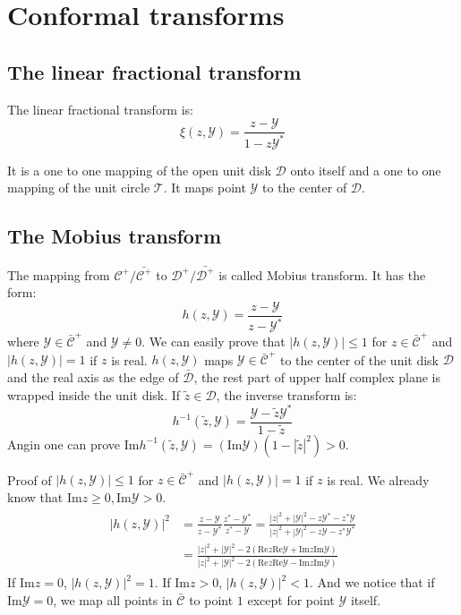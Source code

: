 \documentclass[
	preprint,%
	aps,
	prb,
	showpacs,	
	amsmath, amssymb]{revtex4-2}
\newcommand{\im}{ {\mathrm{Im}} }
\newcommand{\re}{ {\mathrm{Re}} }
\newcommand{\Y}{ {\mathcal{Y}} }
\newcommand{\C}{ {\mathcal{C}} }
\newcommand{\Cbar}{ {\bar{\mathcal{C}}} }
\newcommand{\D}{ {\mathcal{D}} }
\newcommand{\Dbar}{ {\bar{\mathcal{D}}} }
\begin{document}
\appendix
\section{Conformal transforms}
\label{app:conformal-transforms}

\subsection{The linear fractional transform}
\label{appsub:linear-fractional-transform}
The linear fractional transform is:
\begin{equation}\label{eq:linear-fractional-transform}
	\xi(z, \Y) = \frac{z - \Y}{1 - z\Y^*}
\end{equation}

It is a one to one mapping of the open unit disk $\D$ onto 
itself and a one to one mapping of the unit circle $\mathcal{T}$.
It maps point $\Y$ to the center of $\D$.


\subsection{The Mobius transform}
\label{appsub:mobius-transform}
The mapping from $\C^+/\bar{\C^+}$ to 
$\D^+/\bar{\D^+}$ is called Mobius transform.
It has the form:
\begin{equation}\label{eq:def-mobius-transform}
	h(z, \Y)  = \frac{z - \Y}{z - \Y^*}
\end{equation}
where $\Y \in \Cbar^+$ and $\Y \neq 0$. We can easily prove that 
$|h(z, \Y)| \leq 1$ for $z \in \Cbar^+$ and
$|h(z, \Y)| = 1$ if $z$ is real. $h(z, \Y)$ maps $\Y \in \Cbar^+$
to the center of the unit disk $\D$ and the real axis as the 
edge of $\Dbar$, the rest part of upper half complex plane is 
wrapped inside the unit disk. If $ \tilde{z} \in \D$, the inverse 
transform is:
\begin{equation}\label{eq:def-inv-mobius-transform}
	h^{-1}(\tilde{z}, \Y) = \frac{\Y - \tilde{z}\Y^*}{1 - \tilde{z}}
\end{equation}
Angin one can prove 
$\im h^{-1}(\tilde{z}, \Y) = (\im\Y)(1 - |\tilde{z}|^2 ) > 0$.

Proof of $|h(z, \Y)| \leq 1$ for $z \in \Cbar^+$ and
$|h(z, \Y)| = 1$ if $z$ is real. 
We already know that $\im z \geq 0,  \im \Y >0$.
\begin{align}
\begin{split}
|h(z, \Y)|^2 &= \frac{z - \Y}{z - \Y^*} \frac{z^* - \Y^*}{z^* - \Y} 
	  = \frac{|z|^2 + |\Y|^2 - z\Y^* - z^*\Y}{|z|^2 + |\Y|^2 - z\Y - z^*\Y^*}\\
	& = \frac{|z|^2 + |\Y|^2 - 2(\re z \re \Y  + \im z \im \Y)}
		{|z|^2 + |\Y|^2 - 2(\re z \re \Y  - \im z \im \Y)}
\end{split}
\end{align}
If $\im z = 0$, $|h(z, \Y)|^2 = 1$. If $\im z > 0$, $|h(z, \Y)|^2 < 1$.
And we notice that if $\im \Y = 0$, we map all points in $\Cbar$ to 
point $1$ except for point $\Y$ itself.


\end{document}
